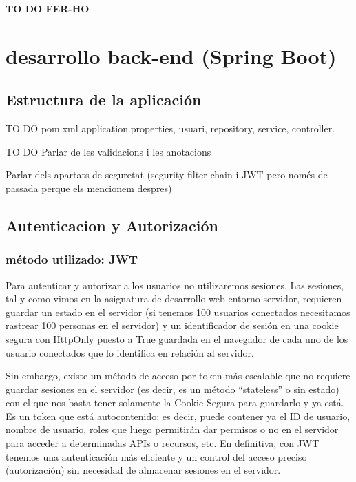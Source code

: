 \documentclass[a4paper,12pt]{report}
\begin{document}
			\textbf{TO DO FER-HO}

			
			\section{desarrollo back-end (Spring Boot)}
			
				\subsection{Estructura de la aplicación}
				\label{sec:estructuraAplicacion}
				
				TO DO pom.xml application.properties, usuari, repository, service, controller.
				
				TO DO Parlar de les validacions i les anotacions 
				
				Parlar dels apartats de seguretat (segurity filter chain i JWT pero només de passada perque els mencionem despres)
				
				\subsection{Autenticacion y Autorización}
				
				\subsubsection{método utilizado: JWT}
				
				Para autenticar y autorizar a los usuarios no utilizaremos sesiones. Las sesiones, tal y como vimos en la asignatura de desarrollo web entorno servidor, requieren guardar un estado en el servidor (si tenemos 100 usuarios conectados necesitamos rastrear 100 personas en el servidor) y un identificador de sesión en una cookie segura con HttpOnly puesto a True guardada en el navegador de cada uno de los usuario conectados que lo identifica en relación al servidor.
				
				Sin embargo, existe un método de acceso por token más escalable que no requiere guardar sesiones en el servidor (es decir, es un método ``stateless'' o sin estado) con el que nos basta tener solamente la Cookie Segura para guardarlo y ya está. Es un token que está autocontenido: es decir, puede contener ya el ID de usuario, nombre de usuario, roles que luego permitirán dar permisos o no en el servidor para acceder a determinadas APIs o recursos, etc. En definitiva, con JWT tenemos una autenticación más eficiente y un control del acceso preciso (autorización) sin necesidad de almacenar sesiones en el servidor.
				
\end{document}

